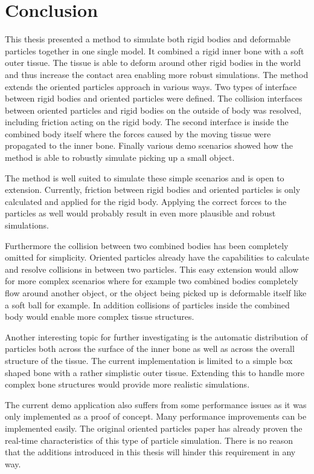 \chapter{Conclusion}
\label{cha:conclusions}

This thesis presented a method to simulate both rigid bodies and deformable particles together in one single model. It combined a rigid inner bone with a soft outer tissue. The tissue is able to deform around other rigid bodies in the world and thus increase the contact area enabling more robust simulations. The method extends the oriented particles approach in various ways. Two types of interface between rigid bodies and oriented particles were defined. The collision interfaces between oriented particles and rigid bodies on the outside of body was resolved, including friction acting on the rigid body. The second interface is inside the combined body itself where the forces caused by the moving tissue were propagated to the inner bone. Finally various demo scenarios showed how the method is able to robustly simulate picking up a small object.

The method is well suited to simulate these simple scenarios and is open to extension. Currently, friction between rigid bodies and oriented particles is only calculated and applied for the rigid body. Applying the correct forces to the particles as well would probably result in even more plausible and robust simulations.

Furthermore the collision between two combined bodies has been completely omitted for simplicity. Oriented particles already have the capabilities to calculate and resolve collisions in between two particles. This easy extension would allow for more complex scenarios where for example two combined bodies completely flow around another object, or the object being picked up is deformable itself like a soft ball for example. In addition collisions of particles inside the combined body would enable more complex tissue structures.

Another interesting topic for further investigating is the automatic distribution of particles both across the surface of the inner bone as well as across the overall structure of the tissue. The current implementation is limited to a simple box shaped bone with a rather simplistic outer tissue. Extending this to handle more complex bone structures would provide more realistic simulations.

The current demo application also suffers from some performance issues as it was only implemented as a proof of concept. Many performance improvements can be implemented easily. The original oriented particles paper has already proven the real-time characteristics of this type of particle simulation. There is no reason that the additions introduced in this thesis will hinder this requirement in any way.